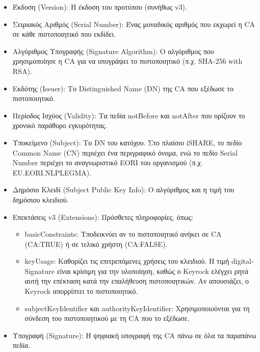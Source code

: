 \begin{itemize}
    \item Έκδοση (\textlatin{Version}): Η έκδοση του προτύπου
    (συνήθως \textlatin{v3}).
    \item Σειριακός Αριθμός (\textlatin{Serial Number}): Ένας
    μοναδικός αριθμός που εκχωρεί η \textlatin{CA} σε κάθε πιστοποιητικό
    που εκδίδει.
    \item Αλγόριθμος Υπογραφής (\textlatin{Signature Algorithm}):
    Ο αλγόριθμος που χρησιμοποίησε η \textlatin{CA} για να υπογράψει
    το πιστοποιητικό (π.χ. \textlatin{SHA-256 with RSA}).
    \item Εκδότης (\textlatin{Issuer}): Το \textlatin{Distinguished
    Name (DN)} της \textlatin{CA} που εξέδωσε το πιστοποιητικό.
    \item Περίοδος Ισχύος (\textlatin{Validity}): Τα πεδία
    \textlatin{notBefore} και \textlatin{notAfter} που ορίζουν το χρονικό
    παράθυρο εγκυρότητας.
    \item Υποκείμενο (\textlatin{Subject}): Το \textlatin{DN} του
    κατόχου. Στο πλαίσιο \textlatin{iSHARE}, το πεδίο \textlatin{Common
    Name (CN)} περιέχει ένα περιγραφικό όνομα, ενώ το πεδίο
    \textlatin{Serial Number} περιέχει το αναγνωριστικό \textlatin{EORI}
    του οργανισμού (π.χ. \textlatin{EU.EORI.NLPLEGMA}).
    \item Δημόσιο Κλειδί (\textlatin{Subject Public Key Info}):
    Ο αλγόριθμος και η τιμή του δημόσιου κλειδιού.
    \item Επεκτάσεις \textlatin{v3} (\textlatin{Extensions}):
    Πρόσθετες πληροφορίες, όπως:
    \begin{itemize}
        \item \textlatin{basicConstraints}: Υποδεικνύει αν το πιστοποιητικό
        ανήκει σε \textlatin{CA} (\textlatin{CA:TRUE}) ή σε τελικό χρήστη
        (\textlatin{CA:FALSE}).
        \item \textlatin{keyUsage}: Καθορίζει τις επιτρεπόμενες χρήσεις του
        κλειδιού. Η τιμή \textlatin{digitalSignature} είναι κρίσιμη για την
        υλοποίηση, καθώς ο \textlatin{Keyrock} ελέγχει ρητά αυτή την
        επέκταση κατά την επαλήθευση πιστοποιητικών. Αν απουσιάζει, ο
        \textlatin{Keyrock} απορρίπτει το πιστοποιητικό.
        \item \textlatin{subjectKeyIdentifier} και
        \textlatin{authorityKeyIdentifier}: Χρησιμοποιούνται για τη σύνδεση
        του πιστοποιητικού με τη \textlatin{CA} που το εξέδωσε.
    \end{itemize}
    \item Υπογραφή (\textlatin{Signature}): Η ψηφιακή υπογραφή
    της \textlatin{CA} πάνω σε όλα τα παραπάνω πεδία.
\end{itemize}

